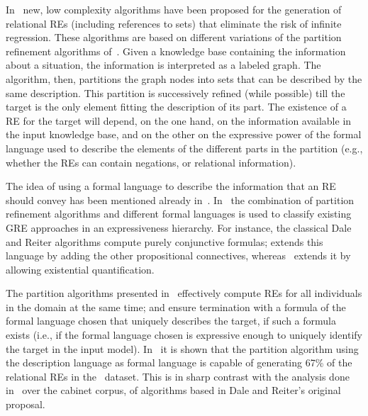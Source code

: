 In~\cite{arec2:2008:Areces,arec:usin11} new, low complexity algorithms have been proposed for the generation 
of relational REs (including references to sets) that eliminate the risk of infinite regression. 
These algorithms are based on different variations of the partition refinement algorithms of~\cite{paig:thre87}.
Given a knowledge base containing the information about a situation, the information is 
interpreted as a labeled graph.  The algorithm, then, partitions the graph nodes into sets that can 
be described by the same description.  This partition is successively refined (while possible) till the target 
is the only element fitting the description of its part.  The existence of a RE for the target will 
depend, on the one hand, on the information available in the input knowledge base, and on the other 
on the expressive power of the formal language used to describe the elements of the different 
parts in the partition (e.g., whether the REs can contain negations, or relational information). 

The idea of using a formal language to describe the information that an RE should convey has been mentioned
already in~\cite{Krahmer2003,gardent07:_gener_bridg_defin_descr}.  In~\cite{arec2:2008:Areces,arec:usin11} the 
combination of partition refinement algorithms and different formal languages is used to classify existing 
GRE approaches in an expressiveness hierarchy.  For instance, the classical Dale and Reiter algorithms
compute purely conjunctive formulas; \cite{deemter02:_gener_refer_expres} extends this language by
adding the other propositional connectives, whereas~\cite{dale91:_gener_refer_expres_invol_relat} extends it by
allowing existential quantification.

The partition algorithms presented in~\cite{arec2:2008:Areces,arec:usin11} effectively
compute REs for all individuals in the domain at the same time; and ensure termination with a formula of 
the formal language chosen that uniquely describes the target, if such a formula exists (i.e., if the 
formal language chosen is expressive enough to uniquely identify the target in the input model). In~\cite{arec2:2008:Areces}
it is shown that the partition algorithm using the description language \el as formal language is capable of generating 67\% of 
the relational REs in the~\cite{viethen06:_algor_for_gener_refer_expres} dataset. This is in sharp contrast with the analysis 
done in~\cite{viethen06:_algor_for_gener_refer_expres} over the cabinet corpus, of algorithms based in Dale and Reiter's original proposal.    

